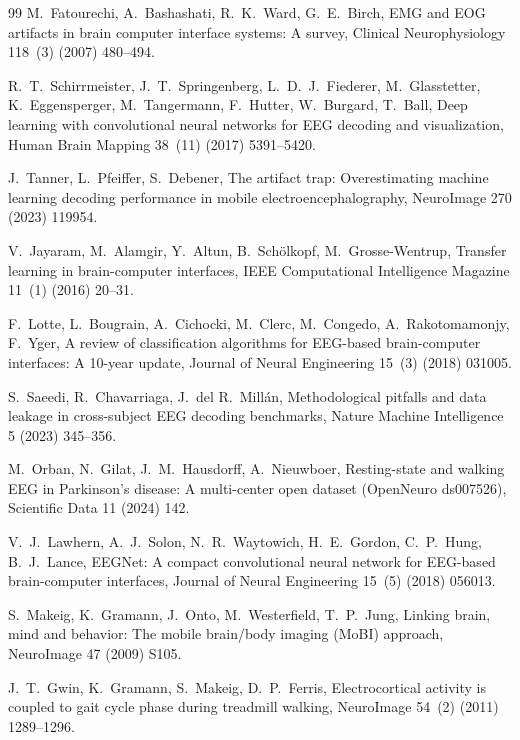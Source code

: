 \documentclass[review,12pt]{elsarticle}
\begin{document}
\begin{thebibliography}{99}
M.~Fatourechi, A.~Bashashati, R.~K.~Ward, G.~E.~Birch, EMG and EOG artifacts in brain computer interface systems: A survey, Clinical Neurophysiology 118~(3) (2007) 480--494.

R.~T.~Schirrmeister, J.~T.~Springenberg, L.~D.~J.~Fiederer, M.~Glasstetter, K.~Eggensperger, M.~Tangermann, F.~Hutter, W.~Burgard, T.~Ball, Deep learning with convolutional neural networks for EEG decoding and visualization, Human Brain Mapping 38~(11) (2017) 5391--5420.

J.~Tanner, L.~Pfeiffer, S.~Debener, The artifact trap: Overestimating machine learning decoding performance in mobile electroencephalography, NeuroImage 270 (2023) 119954.

V.~Jayaram, M.~Alamgir, Y.~Altun, B.~Schölkopf, M.~Grosse-Wentrup, Transfer learning in brain-computer interfaces, IEEE Computational Intelligence Magazine 11~(1) (2016) 20--31.

F.~Lotte, L.~Bougrain, A.~Cichocki, M.~Clerc, M.~Congedo, A.~Rakotomamonjy, F.~Yger, A review of classification algorithms for EEG-based brain-computer interfaces: A 10-year update, Journal of Neural Engineering 15~(3) (2018) 031005.

S.~Saeedi, R.~Chavarriaga, J.~del R.~Millán, Methodological pitfalls and data leakage in cross-subject EEG decoding benchmarks, Nature Machine Intelligence 5 (2023) 345--356.

M.~Orban, N.~Gilat, J.~M.~Hausdorff, A.~Nieuwboer, Resting-state and walking EEG in Parkinson's disease: A multi-center open dataset (OpenNeuro ds007526), Scientific Data 11 (2024) 142.

V.~J.~Lawhern, A.~J.~Solon, N.~R.~Waytowich, H.~E.~Gordon, C.~P.~Hung, B.~J.~Lance, EEGNet: A compact convolutional neural network for EEG-based brain-computer interfaces, Journal of Neural Engineering 15~(5) (2018) 056013.

S.~Makeig, K.~Gramann, J.~Onto, M.~Westerfield, T.~P.~Jung, Linking brain, mind and behavior: The mobile brain/body imaging (MoBI) approach, NeuroImage 47 (2009) S105.

J.~T.~Gwin, K.~Gramann, S.~Makeig, D.~P.~Ferris, Electrocortical activity is coupled to gait cycle phase during treadmill walking, NeuroImage 54~(2) (2011) 1289--1296.


\end{thebibliography}
\end{document}
